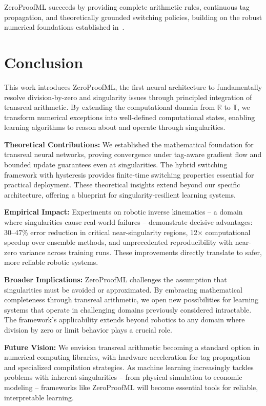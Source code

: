 \documentclass[twoside,11pt]{article}
\newcommand{\TR}{\mathbb{T}}
\newcommand{\RR}{\mathbb{R}}
\begin{document}
ZeroProofML succeeds by providing complete arithmetic rules, continuous tag propagation, and theoretically grounded switching policies, building on the robust numerical foundations established in~\citet{higham2002accuracy,trefethen1997numerical}.

\section{Conclusion}

This work introduces ZeroProofML, the first neural architecture to fundamentally resolve division-by-zero and singularity issues through principled integration of transreal arithmetic. By extending the computational domain from $\RR$ to $\TR$, we transform numerical exceptions into well-defined computational states, enabling learning algorithms to reason about and operate through singularities.

\textbf{Theoretical Contributions:} We established the mathematical foundation for transreal neural networks, proving convergence under tag-aware gradient flow and bounded update guarantees even at singularities. The hybrid switching framework with hysteresis provides finite-time switching properties essential for practical deployment. These theoretical insights extend beyond our specific architecture, offering a blueprint for singularity-resilient learning systems.

\textbf{Empirical Impact:} Experiments on robotic inverse kinematics -- a domain where singularities cause real-world failures -- demonstrate decisive advantages: 30--47\% error reduction in critical near-singularity regions, 12$\times$ computational speedup over ensemble methods, and unprecedented reproducibility with near-zero variance across training runs. These improvements directly translate to safer, more reliable robotic systems.

\textbf{Broader Implications:} ZeroProofML challenges the assumption that singularities must be avoided or approximated. By embracing mathematical completeness through transreal arithmetic, we open new possibilities for learning systems that operate in challenging domains previously considered intractable. The framework's applicability extends beyond robotics to any domain where division by zero or limit behavior plays a crucial role.

\textbf{Future Vision:} We envision transreal arithmetic becoming a standard option in numerical computing libraries, with hardware acceleration for tag propagation and specialized compilation strategies. As machine learning increasingly tackles problems with inherent singularities -- from physical simulation to economic modeling -- frameworks like ZeroProofML will become essential tools for reliable, interpretable learning.
\end{document}
